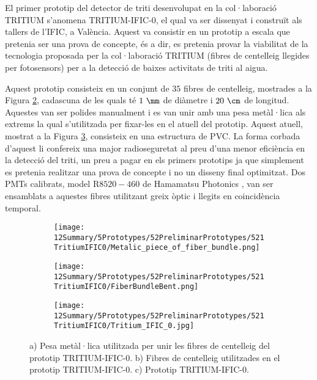 El primer prototip del detector de triti desenvolupat en la col·laboració TRITIUM s'anomena TRITIUM-IFIC-0, el qual va ser dissenyat i construït als tallers de l'IFIC, a València. Aquest va consistir en un prototip a escala que pretenia ser una prova de concepte, és a dir, es pretenia provar la viabilitat de la tecnologia proposada per la col·laboració TRITIUM (fibres de centelleig llegides per fotosensors) per a la detecció de baixes activitats de triti al aigua.

Aquest prototip consisteix en un conjunt de $35$ fibres de centelleig, mostrades a la Figura \ref{subfig:FibresDobladesTritiumIFIC0}, cadascuna de les quals té $1~\mm$ de diàmetre i $20~\cm$ de longitud. Aquestes van ser polides manualment i es van unir amb una pesa metàl·lica als extrems la qual s'utilitzada per fixar-les en el atuell del prototip. Aquest atuell, mostrat a la Figura \ref{subfig:PrototipTritiumIFIC0}, consisteix en una estructura de PVC. La forma corbada d'aquest li confereix una major radioseguretat al preu d'una menor eficiència en la detecció del triti, un preu a pagar en els primers prototips ja que simplement es pretenia realitzar una prova de concepte i no un disseny final optimitzat. Dos PMTs calibrats, model R$8520-460$ de Hamamatsu Photonics \cite{DataSheetPMTs}, van ser ensamblats a aquestes fibres utilitzant greix òptic \cite{OpticalGrease} i llegits en coincidència temporal.

\begin{figure}
\centering
    \begin{subfigure}[b]{0.5\textwidth}
    \centering
    \texttt{[image: 12Summary/5Prototypes/52PreliminarPrototypes/521TritiumIFIC0/Metalic\_piece\_of\_fiber\_bundle.png]}  
    \caption{\label{subfig:PesaMetalicaFibresTritiumIFIC0}}
    \end{subfigure}
    \hfill
    \begin{subfigure}[b]{0.4\textwidth}
    \centering
    \texttt{[image: 12Summary/5Prototypes/52PreliminarPrototypes/521TritiumIFIC0/FiberBundleBent.png]}  
    \caption{\label{subfig:FibresDobladesTritiumIFIC0}}
    \end{subfigure}
    \hfill
    \begin{subfigure}[b]{0.7\textwidth}
    \centering
    \texttt{[image: 12Summary/5Prototypes/52PreliminarPrototypes/521TritiumIFIC0/Tritium\_IFIC\_0.jpg]}  
    \caption{\label{subfig:PrototipTritiumIFIC0}}
    \end{subfigure}
 \caption{a) Pesa metàl·lica utilitzada per unir les fibres de centelleig del prototip TRITIUM-IFIC-0. b) Fibres de centelleig utilitzades en el prototip TRITIUM-IFIC-0. c) Prototip TRITIUM-IFIC-0.} \label{fig:TritiumIFIC0s}
\end{figure}

